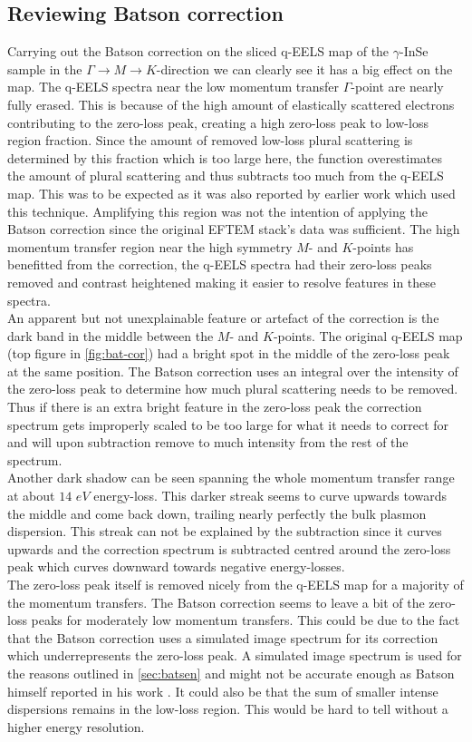 \subsection{Reviewing Batson correction}
Carrying out the Batson correction on the sliced q-EELS map of the $\gamma$-InSe sample in the $\Gamma \rightarrow M \rightarrow K$-direction we can clearly see it has a big effect on the map. The q-EELS spectra near the low momentum transfer $\Gamma$-point are nearly fully erased. This is because of the high amount of elastically scattered electrons contributing to the zero-loss peak, creating a high zero-loss peak to low-loss region fraction. Since the amount of removed low-loss plural scattering is determined by this fraction which is too large here, the function overestimates the amount of plural scattering and thus subtracts too much from the q-EELS map. This was to be expected as it was also reported by earlier work which used this technique.\cite{Schneider:191230} Amplifying this region was not the intention of applying the Batson correction since the original EFTEM stack's data was sufficient. The high momentum transfer region near the high symmetry $M$- and $K$-points has benefitted from the correction, the q-EELS spectra had their zero-loss peaks removed and contrast heightened making it easier to resolve features in these spectra.\\
An apparent but not unexplainable feature or artefact of the correction is the dark band in the middle between the $M$- and $K$-points. The original q-EELS map (top figure in \ref{fig:bat-cor}) had a bright spot in the middle of the zero-loss peak at the same position. The Batson correction uses an integral over the intensity of the zero-loss peak to determine how much plural scattering needs to be removed. Thus if there is an extra bright feature in the zero-loss peak the correction spectrum gets improperly scaled to be too large for what it needs to correct for and will upon subtraction remove to much intensity from the rest of the spectrum.\\
Another dark shadow can be seen spanning the whole momentum transfer range at about $14$ $eV$ energy-loss. This darker streak seems to curve upwards towards the middle and come back down, trailing nearly perfectly the bulk plasmon dispersion. This streak can not be explained by the subtraction since it curves upwards and the correction spectrum is subtracted centred around the zero-loss peak which curves downward towards negative energy-losses.\\
The zero-loss peak itself is removed nicely from the q-EELS map for a majority of the momentum transfers. The Batson correction seems to leave a bit of the zero-loss peaks for moderately low momentum transfers. This could be due to the fact that the Batson correction uses a simulated image spectrum for its correction which underrepresents the zero-loss peak. A simulated image spectrum is used for the reasons outlined in \ref{sec:batsen} and might not be accurate enough as Batson himself reported in his work \cite{PhysRevB.27.5224}. It could also be that the sum of smaller intense dispersions remains in the low-loss region. This would be hard to tell without a higher energy resolution.\\
